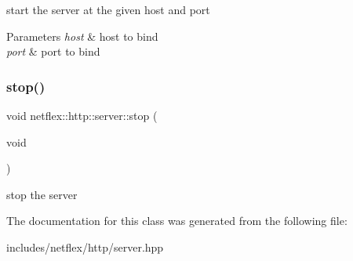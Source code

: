 start the server at the given host and port


\begin{DoxyParams}{Parameters}
{\em host} & host to bind \\
\hline
{\em port} & port to bind \\
\hline
\end{DoxyParams}
\mbox{\label{classnetflex_1_1http_1_1server_aee4736188137a75879e972d325b2c460}} 
\subsubsection{\texorpdfstring{stop()}{stop()}}
{\footnotesize\ttfamily void netflex\+::http\+::server\+::stop (\begin{DoxyParamCaption}\item[{void}]{ }\end{DoxyParamCaption})}

stop the server 

The documentation for this class was generated from the following file\+:\begin{DoxyCompactItemize}
\item 
includes/netflex/http/server.\+hpp\end{DoxyCompactItemize}
